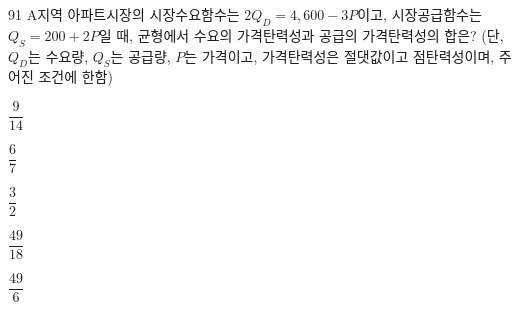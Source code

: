 \begin{question}{91}
A지역 아파트시장의 시장수요함수는 $2Q_{D}=4{,}600-3P$이고, 시장공급함수는 $Q_{S}=200+2P$일 때, 균형에서 수요의 가격탄력성과 공급의 가격탄력성의 합은? (단, $Q_{D}$는 수요량, $Q_{S}$는 공급량, $P$는 가격이고, 가격탄력성은 절댓값이고 점탄력성이며, 주어진 조건에 한함)
\begin{choices}
  \item $\dfrac{9}{14}$
  \item $\dfrac{6}{7}$
  \item $\dfrac{3}{2}$
  \item $\dfrac{49}{18}$
  \item $\dfrac{49}{6}$
\end{choices}
\end{question}
